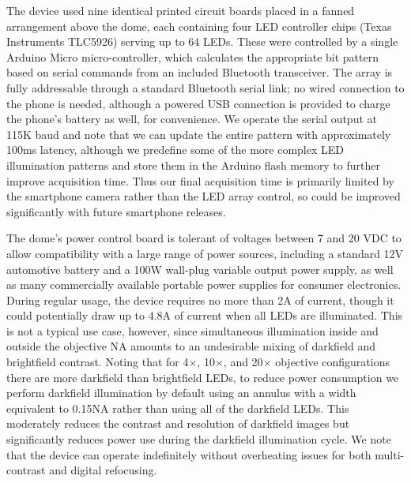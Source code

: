The device used nine identical printed circuit boards placed in a fanned arrangement above the dome, each containing four LED controller chips (Texas Instruments TLC5926) serving up to 64 LEDs. These were controlled by a single Arduino Micro micro-controller, which calculates the appropriate bit pattern based on serial commands from an included Bluetooth transceiver. The array is fully addressable through a standard Bluetooth serial link; no wired connection to the phone is needed, although a powered USB connection is provided to charge the phone’s battery as well, for convenience. We operate the serial output at 115K baud and note that we can update the entire pattern with approximately 100ms latency, although we predefine some of the more complex LED illumination patterns and store them in the Arduino flash memory to further improve acquisition time. Thus our final acquisition time is primarily limited by the smartphone camera rather than the LED array control, so could be improved significantly with future smartphone releases.

The dome's power control board is tolerant of voltages between 7 and 20 VDC to allow compatibility with a large range of power sources, including a standard 12V automotive battery and a 100W wall-plug variable output power supply, as well as many commercially available portable power supplies for consumer electronics. During regular usage, the device requires no more than 2A of current, though it could potentially draw up to 4.8A of current when all LEDs are illuminated. This is not a typical use case, however, since simultaneous illumination inside and outside the objective NA amounts to an undesirable mixing of darkfield and brightfield contrast. Noting that for 4$\times$, 10$\times$, and 20$\times$ objective configurations there are more darkfield than brightfield LEDs, to reduce power consumption we perform darkfield illumination by default using an annulus with a width equivalent to 0.15NA rather than using all of the darkfield LEDs. This moderately reduces the contrast and resolution of darkfield images but significantly reduces power use during the darkfield illumination cycle. We note that the device can operate indefinitely without overheating issues for both multi-contrast and digital refocusing. 

